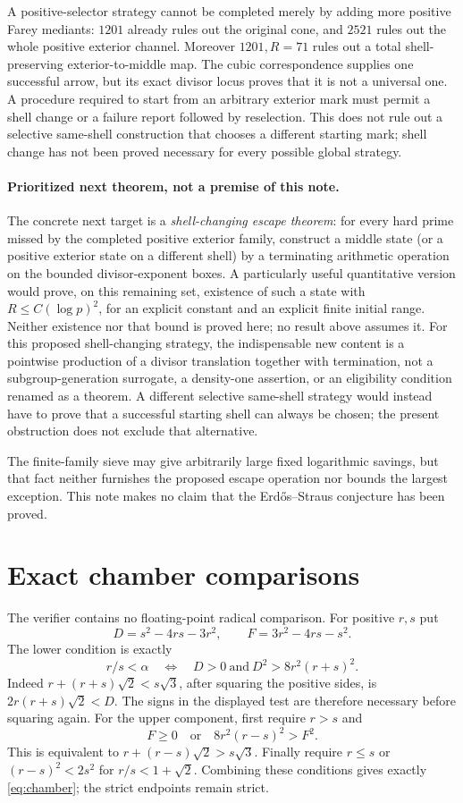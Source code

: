 \documentclass[11pt]{article}
\theoremstyle{remark}\newtheorem{remark}[theorem]{Remark}
\begin{document}
A positive-selector strategy cannot be completed merely by adding more positive Farey mediants: $1201$ already rules out the original cone, and $2521$ rules out the whole positive exterior channel. Moreover $1201,R=71$ rules out a total shell-preserving exterior-to-middle map. The cubic correspondence supplies one successful arrow, but its exact divisor locus proves that it is not a universal one. A procedure required to start from an arbitrary exterior mark must permit a shell change or a failure report followed by reselection. This does not rule out a selective same-shell construction that chooses a different starting mark; shell change has not been proved necessary for every possible global strategy.

\paragraph{Prioritized next theorem, not a premise of this note.}
The concrete next target is a \emph{shell-changing escape theorem}: for every hard prime missed by the completed positive exterior family, construct a middle state (or a positive exterior state on a different shell) by a terminating arithmetic operation on the bounded divisor-exponent boxes. A particularly useful quantitative version would prove, on this remaining set, existence of such a state with $R\le C(\log p)^2$, for an explicit constant and an explicit finite initial range. Neither existence nor that bound is proved here; no result above assumes it. For this proposed shell-changing strategy, the indispensable new content is a pointwise production of a divisor translation together with termination, not a subgroup-generation surrogate, a density-one assertion, or an eligibility condition renamed as a theorem. A different selective same-shell strategy would instead have to prove that a successful starting shell can always be chosen; the present obstruction does not exclude that alternative.

The finite-family sieve may give arbitrarily large fixed logarithmic savings, but that fact neither furnishes the proposed escape operation nor bounds the largest exception. This note makes no claim that the Erd\H{o}s--Straus conjecture has been proved.

\appendix
\section{Exact chamber comparisons}\label{app:chamber}
The verifier contains no floating-point radical comparison. For positive $r,s$ put
\[
 D=s^2-4rs-3r^2,\qquad F=3r^2-4rs-s^2.
\]
The lower condition is exactly
\[
 r/s<\alpha\quad\Longleftrightarrow\quad D>0\ \text{and}\ D^2>8r^2(r+s)^2.
\]
Indeed $r+(r+s)\sqrt2<s\sqrt3$, after squaring the positive sides, is $2r(r+s)\sqrt2<D$. The signs in the displayed test are therefore necessary before squaring again.
For the upper component, first require $r>s$ and
\[
 F\ge0\quad\text{or}\quad8r^2(r-s)^2>F^2.
\]
This is equivalent to $r+(r-s)\sqrt2>s\sqrt3$. Finally require $r\le s$ or $(r-s)^2<2s^2$ for $r/s<1+\sqrt2$. Combining these conditions gives exactly \eqref{eq:chamber}; the strict endpoints remain strict.
\end{document}
